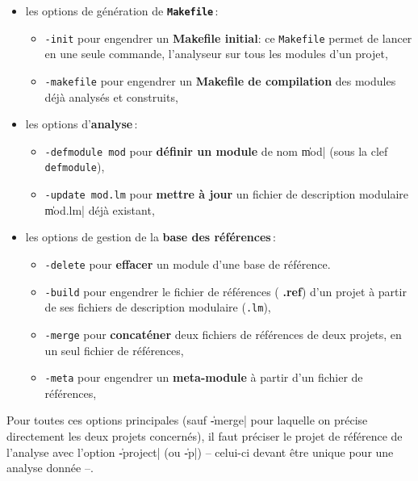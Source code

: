 \begin{itemize}
\item {les options de g\'{e}n\'{e}ration de {\bf {\tt Makefile}}\,:}
\begin{itemize}
\item {\tt -init} pour engendrer un {\bf Makefile initial}: ce {\tt Makefile}
permet de lancer en une seule commande, l'analyseur sur tous les
modules d'un projet,

\item {\tt -makefile} pour engendrer un {\bf Makefile de compilation} des
modules d\'{e}j\`{a} analys\'{e}s et construits,
\end{itemize}

\item {les options d'{\bf analyse}\,:}
\begin{itemize}
\item {\tt -defmodule mod} pour {\bf d\'{e}finir un module} de nom \|mod|
(sous la clef {\tt defmodule}),

\item {\tt -update mod.lm} pour {\bf mettre \`{a} jour} un fichier de
description modulaire \|mod.lm| d\'{e}j\`{a} existant,
\end{itemize}

\item {les options de gestion de la {\bf base des r\'{e}f\'{e}rences}\,:}
\begin{itemize}
\item {\tt -delete} pour {\bf effacer} un module d'une base de r\'{e}f\'{e}rence.

\item {\tt -build} pour engendrer le fichier de r\'{e}f\'{e}rences ({\bf
.ref}) d'un projet \`{a} partir de ses fichiers de description modulaire
({\tt .lm}),

\item {\tt -merge} pour {\bf concat\'{e}ner} deux fichiers de r\'{e}f\'{e}rences de
deux projets, en un seul fichier de r\'{e}f\'{e}rences,

\item {\tt -meta} pour engendrer un {\bf meta-module} \`{a} partir d'un
fichier de r\'{e}f\'{e}rences,
\end{itemize}
\end{itemize}

Pour toutes ces options principales (sauf \|-merge| pour laquelle on
pr\'{e}cise directement les deux projets concern\'{e}s), il faut
pr\'{e}ciser le projet de r\'{e}f\'{e}rence de l'analyse avec l'option \|-project| (ou
\|-p|) -- celui-ci devant \^{e}tre unique pour une analyse donn\'{e}e --. \\

